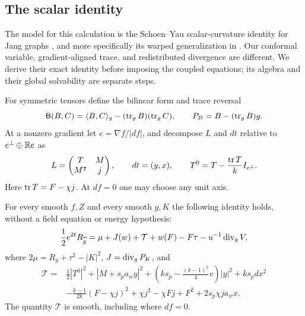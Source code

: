 \subsection{The scalar identity}

The model for this calculation is the Schoen--Yau scalar-curvature
identity for Jang graphs \cite{SchoenYau1981}, and more specifically
its warped generalization in \cite[Identity~9, p.~580]{BrayKhuri2011}.
Our conformal variable, gradient-aligned trace, and redistributed
divergence are different. We derive their exact identity before
imposing the coupled equations; its algebra and their global
solvability are separate steps.

For symmetric tensors define the bilinear form and trace reversal
\[
 \mathsf B(B,C)=\langle B,C\rangle_g-(\operatorname{tr}_gB)(\operatorname{tr}_gC),
 \qquad P_B=B-(\operatorname{tr}_gB)g.
\]
At a nonzero gradient let $e=\nabla f/|df|$, and decompose $L$ and $dt$
relative to $e^\perp\oplus\mathbb R e$ as
\[
 L=\begin{pmatrix}T&M\\M^\intercal&j\end{pmatrix},\qquad dt=(y,x),
 \qquad T^0=T-\frac{\operatorname{tr} T}{k}I_{e^\perp}.
\]
Here $\operatorname{tr} T=F-\chi j$.  At $df=0$ one may choose any unit axis.

\begin{proposition}\label{prop:scalar:identity}
For every smooth $f,Z$ and every smooth $g,K$ the following identity
holds, without a field equation or energy hypothesis:
\begin{equation}
 \frac12e^{2t}R_{\widehat g}
 =\mu+J(w)+\mathcal T+w(F)-F\tau-u^{-1}\operatorname{div}_g V,
 \label{eq:scalar:identity}
\end{equation}
where $2\mu=R_g+\tau^2-|K|^2$, $J=\operatorname{div}_gP_K$, and
\begin{equation}
 \begin{aligned}
 \mathcal T={}&\frac12|T^0|^2+|M+s_pa_wy|^2
       +\left(ks_p-\frac{(k-1)^2}{4}v\right)|y|^2+ks_pd x^2\\
 &-\frac{k-1}{2k}(F-\chi j)^2+\chi j^2-\chi Fj+F^2
       +2s_p\chi j a_w x .
 \end{aligned}
 \label{eq:scalar:quadratic}
\end{equation}
The quantity $\mathcal T$ is smooth, including where $df=0$.
\end{proposition}

